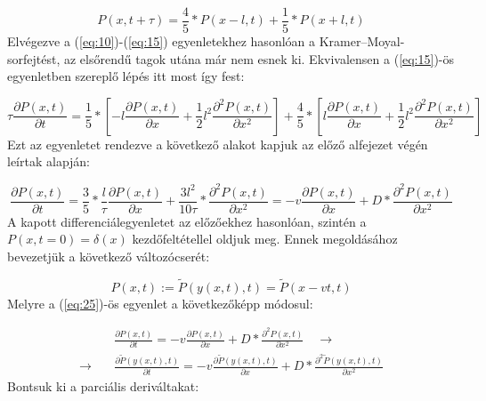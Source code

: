 \begin{equation} \label{eq:23}
    P \left( x, t + \tau \right)
    =
    \frac{4}{5} * P \left( x - l, t \right) + \frac{1}{5} * P \left( x + l, t \right)
\end{equation}
Elvégezve a (\ref{eq:10})-(\ref{eq:15}) egyenletekhez hasonlóan a Kramer--Moyal-sorfejtést, az elsőrendű tagok utána már nem esnek ki. Ekvivalensen a (\ref{eq:15})-ös egyenletben szereplő lépés itt most így fest:

\begin{equation} \label{eq:24}
    \tau \frac{\partial P \left( x, t \right)}{\partial t}
    =
    \frac{1}{5} * \left[ -l \frac{\partial P \left( x, t \right)}{\partial x} + \frac{1}{2} l^{2} \frac{\partial^{2} P \left( x, t \right)}{\partial x^{2}} \right] + \frac{4}{5} * \left[ l \frac{\partial P \left( x, t \right)}{\partial x} + \frac{1}{2} l^{2} \frac{\partial^{2} P \left( x, t \right)}{\partial x^{2}} \right]
\end{equation}
Ezt az egyenletet rendezve a következő alakot kapjuk az előző alfejezet végén leírtak alapján:

\begin{equation} \label{eq:25}
    \frac{\partial P \left( x, t \right)}{\partial t}
    =
    \frac{3}{5} * \frac{l}{\tau} \frac{\partial P \left( x, t \right)}{\partial x} + \frac{3 l^{2}}{10 \tau} * \frac{\partial^{2} P \left( x, t \right)}{\partial x^{2}}
    =
    - v \frac{\partial P \left( x, t \right)}{\partial x} + D * \frac{\partial^{2} P \left( x, t \right)}{\partial x^{2}}
\end{equation}
A kapott differenciálegyenletet az előzőekhez hasonlóan, szintén a $P \left( x, t=0 \right) = \delta \left( x \right)$ kezdőfeltétellel oldjuk meg. Ennek megoldásához bevezetjük a következő változócserét:

\begin{equation*}
    P \left( x, t \right)
    :=
    \tilde{P} \left( y \left( x, t \right), t \right)
    =
    \tilde{P} \left( x - vt, t \right)
\end{equation*}
Melyre a (\ref{eq:25})-ös egyenlet a következőképp módosul:

\begin{align} \label{eq:26}
    &\frac{\partial P \left( x, t \right)}{\partial t}
    =
    - v \frac{\partial P \left( x, t \right)}{\partial x} + D * \frac{\partial^{2} P \left( x, t \right)}{\partial x^{2}} \quad \to \nonumber \\
    \to \quad &
    \frac{\partial \tilde{P} \left( y \left( x, t \right), t \right)}{\partial t}
    =
    - v \frac{\partial \tilde{P} \left( y \left( x, t \right), t \right)}{\partial x} + D * \frac{\partial^{2} \tilde{P} \left( y \left( x, t \right), t \right)}{\partial x^{2}}
\end{align}
Bontsuk ki a parciális deriváltakat:

